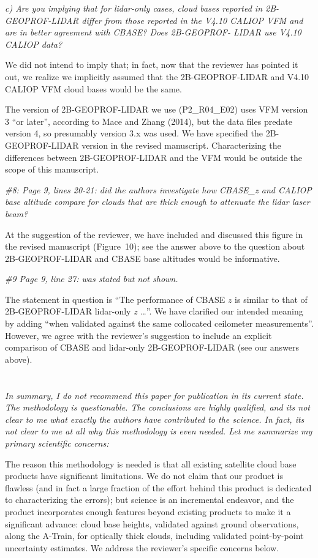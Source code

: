 \documentclass[12pt,a4paper]{responses}
\begin{document}
\textit{c) Are you implying that for lidar-only
cases, cloud bases reported in 2B-GEOPROF-LIDAR differ from those reported in the
V4.10 CALIOP VFM and are in better agreement with CBASE? Does 2B-GEOPROF-
LIDAR use V4.10 CALIOP data?}

We did not intend to imply that; in fact, now that the reviewer has pointed it
out, we realize we implicitly assumed that the 2B-GEOPROF-LIDAR and V4.10 CALIOP
VFM cloud bases would be the same.  

The version of 2B-GEOPROF-LIDAR we use (P2\_R04\_E02) uses VFM version 3 ``or
later'', according to Mace and Zhang (2014), but the data files predate version
4, so presumably version 3.x was used.  We have specified the 2B-GEOPROF-LIDAR
version in the revised manuscript.  Characterizing the differences between
2B-GEOPROF-LIDAR and the VFM would be outside the scope of this manuscript.

\textit{\#8: Page 9, lines 20-21: did the authors investigate how CBASE\_z and CALIOP base
altitude compare for clouds that are thick enough to attenuate the lidar laser
beam?}

At the suggestion of the reviewer, we have included and discussed this figure in
the revised manuscript (Figure~10); see the answer above to the question about
2B-GEOPROF-LIDAR and CBASE base altitudes would be informative.

\textit{\#9 Page 9, line 27: was stated but not shown.}

The statement in question is ``The performance of CBASE $z$ is similar to that
of 2B-GEOPROF-LIDAR lidar-only $z$ \dots''.  We have clarified our intended
meaning by adding ``when validated against the same collocated ceilometer
measurements''.  However, we agree with the reviewer's suggestion to include an
explicit comparison of CBASE and lidar-only 2B-GEOPROF-LIDAR (see our answers above).

\clearpage
\section{}

\textit{In summary, I do not recommend this paper for publication in its current state.  The
methodology is questionable. The conclusions are highly qualified, and its not clear to
me what exactly the authors have contributed to the science. In fact, its not clear to me
at all why this methodology is even needed.  Let me summarize my primary scientific
concerns:}

The reason this methodology is needed is that all existing satellite cloud base
products have significant limitations.  We do not claim that our product is
flawless (and in fact a large fraction of the effort behind this product is
dedicated to characterizing the errors); but science is an incremental endeavor,
and the product incorporates enough features beyond existing products to make it
a significant advance: cloud base heights, validated against ground
observations, along the A-Train, for optically thick clouds, including validated
point-by-point uncertainty estimates.  We address the reviewer's specific
concerns below.
\end{document}

